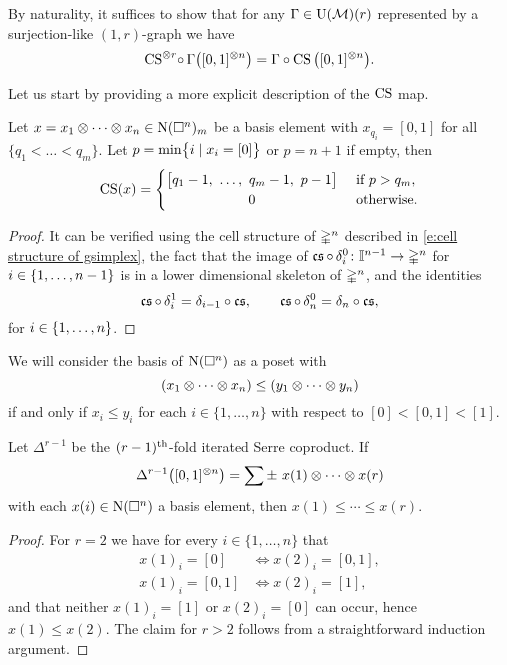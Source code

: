 By naturality, it suffices to show that for any $\Gamma \in \UM(r)$ represented by a surjection-like $(1,r)$-graph we have
\begin{equation*}
	\CS^{\ot r} \! \circ \, \Gamma \big( [0,1]^{\ot n} \big) =
	\Gamma \circ \CS \big( [0,1]^{\ot n} \big).
\end{equation*}

Let us start by providing a more explicit description of the $\CS$ map.

\begin{lemma} \label{l:cs explicit}
	Let $x = x_1 \ot \cdots \ot x_n \in \chains(\cube^n)_m$ be a basis element with $x_{q_i} = [0,1]$ for all $\{q_1 < \dots < q_m\}$.
	Let $p = \min \set[\big]{i \mid x_i = [0]}$ or $p = n+1$ if empty, then
	\[
	\CS(x) =
	\begin{cases}
		\big[ q_1-1, \ \dots , \ q_m-1, \ p-1 \big] & \text{ if } p > q_m, \\
		\hfil 0 & \text{ otherwise}.
	\end{cases}
	\]
\end{lemma}

\begin{proof}
	It can be verified using the cell structure of $\gsimplex^n$ described in \cref{e:cell structure of gsimplex}, the fact that the image of $\cs \circ \, \delta^0_i \colon \gcube^{n-1} \to \gsimplex^n$ for $i \in \set{1,\dots,n-1}$ is in a lower dimensional skeleton of $\gsimplex^n$, and the identities
	\[
	\cs \circ \, \delta_i^1 = \delta_{i-1} \circ \cs,
	\qquad
	\cs \circ \, \delta_n^0 = \delta_n \circ \cs,
	\]
	for $i \in \set{1, \dots, n}$.
\end{proof}

We will consider the basis of $\chains(\cube^n)$ as a poset with
\[
(x_1 \ot \cdots \ot x_n) \leq (y_1 \ot \cdots \ot y_n)
\]
if and only if $x_i \leq y_i$ for each $i \in \{1, \dots, n\}$ with respect to $[0] < [0,1] < [1]$.

\begin{lemma}
	Let $\Delta^{r-1}$ be the $(r-1)^\th$-fold iterated Serre coproduct.
	If
	\[
	\Delta^{r-1} \big([0,1]^{\ot n}\big) =
	\sum \pm \ x{(1)} \ot \cdots \ot x{(r)}
	\]
	with each $x(i) \in \chains(\cube^n)$ a basis element, then $x{(1)} \leq \cdots \leq x{(r)}$.
\end{lemma}

\begin{proof}
	For $r = 2$ we have for every $i \in \{1, \dots, n\}$ that
	\begin{align*}
		x(1)_i = [0]   & \iff x(2)_i = [0,1], \\
		x(1)_i = [0,1] & \iff x(2)_i = [1],
	\end{align*}
	and that neither $x(1)_i = [1]$ or $x(2)_i = [0]$ can occur, hence $x(1) \leq x(2)$.
	The claim for $r > 2$ follows from a straightforward induction argument.
\end{proof}

